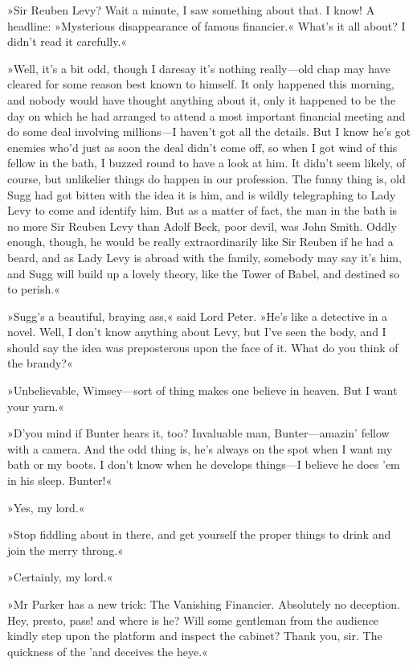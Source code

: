 »Sir Reuben Levy? Wait a minute, I saw something about that. I know! A headline: »Mysterious disappearance of famous financier.« What's it all about? I didn't read it carefully.«

»Well, it's a bit odd, though I daresay it's nothing really\allowbreak---\allowbreak old chap may have cleared for some reason best known to himself. It only happened this morning, and nobody would have thought anything about it, only it happened to be the day on which he had arranged to attend a most important financial meeting and do some deal involving millions\allowbreak---\allowbreak I haven't got all the details. But I know he's got enemies who'd just as soon the deal didn't come off, so when I got wind of this fellow in the bath, I buzzed round to have a look at him. It didn't seem likely, of course, but unlikelier things do happen in our profession. The funny thing is, old Sugg had got bitten with the idea it is him, and is wildly telegraphing to Lady Levy to come and identify him. But as a matter of fact, the man in the bath is no more Sir Reuben Levy than Adolf Beck, poor devil, was John Smith. Oddly enough, though, he would be really extraordinarily like Sir Reuben if he had a beard, and as Lady Levy is abroad with the family, somebody may say it's him, and Sugg will build up a lovely theory, like the Tower of Babel, and destined so to perish.«

»Sugg's a beautiful, braying ass,« said Lord Peter. »He's like a detective in a novel. Well, I don't know anything about Levy, but I've seen the body, and I should say the idea was preposterous upon the face of it. What do you think of the brandy?«

»Unbelievable, Wimsey\allowbreak---\allowbreak sort of thing makes one believe in heaven. But I want your yarn.«

»D'you mind if Bunter hears it, too? Invaluable man, Bunter\allowbreak---\allowbreak amazin' fellow with a camera. And the odd thing is, he's always on the spot when I want my bath or my boots. I don't know when he develops things\allowbreak---\allowbreak I believe he does 'em in his sleep. Bunter!«

»Yes, my lord.«

»Stop fiddling about in there, and get yourself the proper things to drink and join the merry throng.«

»Certainly, my lord.«

»Mr Parker has a new trick: The Vanishing Financier. Absolutely no deception. Hey, presto, pass! and where is he? Will some gentleman from the audience kindly step upon the platform and inspect the cabinet? Thank you, sir. The quickness of the 'and deceives the heye.«

